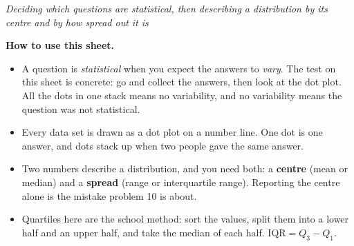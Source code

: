 \documentclass[12pt]{article}
\begin{document}

\begin{center}\small\textit{Deciding which questions are statistical, then describing a
distribution by its centre and by how spread out it is}\end{center}

\noindent\small\textbf{How to use this sheet.}
\begin{itemize}[label={$\bullet$}, leftmargin=1.1cm, itemsep=1pt, topsep=2pt]
  \item A question is \emph{statistical} when you expect the answers to \emph{vary}. The
        test on this sheet is concrete: go and collect the answers, then look at the dot
        plot. All the dots in one stack means no variability, and no variability means the
        question was not statistical.
  \item Every data set is drawn as a dot plot on a number line. One dot is one answer, and
        dots stack up when two people gave the same answer.
  \item Two numbers describe a distribution, and you need both: a \textbf{centre} (mean or
        median) and a \textbf{spread} (range or interquartile range). Reporting the centre
        alone is the mistake problem 10 is about.
  \item Quartiles here are the school method: sort the values, split them into a lower half
        and an upper half, and take the median of each half. $\text{IQR} = Q_3 - Q_1$.
\end{itemize}
\normalsize

\bigskip
\end{document}
